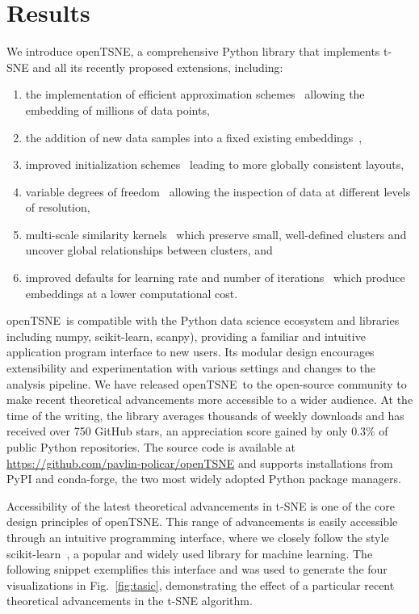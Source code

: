 \documentclass[letter]{article}
\newcommand{\opentsne}{\textsf{openTSNE}}
\begin{document}
\section*{Results}

We introduce \opentsne, a comprehensive Python library that implements t-SNE
and all its recently proposed extensions, including:
\begin{enumerate}
\item the implementation of efficient approximation 
	schemes~\cite{van2014accelerating,linderman2019fast} allowing the embedding
	of millions of data points,
\item the addition of new data samples into a fixed existing
	embeddings~\cite{policar2019embedding},
\item improved initialization schemes~\cite{kobak2019umap} leading to more
	globally consistent layouts,
\item variable degrees of freedom~\cite{kobak2019heavy} allowing the inspection
	of data at different levels of resolution,
\item multi-scale similarity kernels~\cite{kobak2019art} which preserve small,
	well-defined clusters and uncover global relationships between clusters,
	and
\item improved defaults for learning rate and number of
	iterations~\cite{belkina2019automated} which produce embeddings at a lower
	computational cost.
\end{enumerate}

\opentsne\ is compatible with the Python data science ecosystem and
libraries including \textsf{numpy}, \textsf{scikit-learn}, \textsf{scanpy}),
providing a familiar and intuitive application program interface to new
users. Its modular design encourages extensibility and experimentation with
various settings and changes to the analysis pipeline. We have released
\opentsne\ to the open-source community to make recent theoretical advancements
more accessible to a wider audience. At
the time of the writing, the library averages thousands of weekly
downloads and has received over 750 GitHub stars, an appreciation score gained
by only $0.3\%$ of public Python repositories. The source code is available at
\url{https://github.com/pavlin-policar/openTSNE} and supports installations from
\textsf{PyPI} and \textsf{conda-forge}, the two most widely adopted Python
package managers.

Accessibility of the latest theoretical advancements in t-SNE is one of the core
design principles of \opentsne. This range of advancements is easily accessible through an intuitive
programming interface, where we closely follow the style
\textsf{scikit-learn}~\cite{sklearn_api}, a popular and widely used
library for machine learning. The following snippet exemplifies this interface
and was used to generate the four visualizations in Fig.~\ref{fig:tasic}, demonstrating the
effect of a particular recent theoretical advancements in the t-SNE algorithm. 
\end{document}
